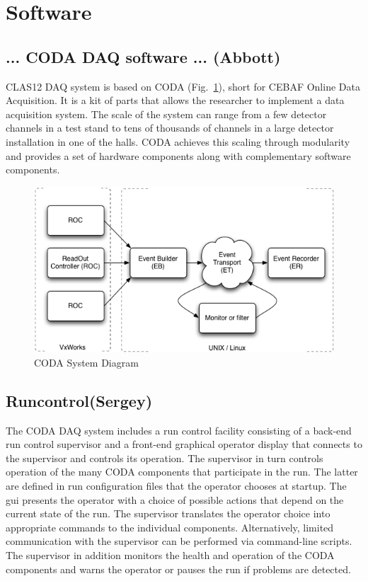 \section{Software}

\subsection{... CODA DAQ software ... (Abbott)}

CLAS12 DAQ system is based on CODA (Fig.~\ref{fig:coda_diagram}), short for CEBAF Online Data Acquisition. It is a kit of parts that allows the researcher to implement a data acquisition system. The scale of the system can range from a few detector channels in a test stand to tens of thousands of channels in a large detector installation in one of the halls. CODA achieves this scaling through modularity and provides a set of hardware components along with complementary software components.

\begin{figure}[hbt]
	\centering
	\includegraphics[width=1.0\columnwidth,keepaspectratio]{img/coda_diagram.png}
	\caption{CODA System Diagram}
	\label{fig:coda_diagram}
\end{figure}


\subsection {Runcontrol(Sergey)}

The CODA DAQ system includes a run control facility consisting of a back-end run control supervisor and a front-end graphical operator display that connects to the supervisor and controls its operation. The supervisor in turn controls operation of the many CODA components that participate in the run. The latter are defined in run configuration files that the operator chooses at startup. The gui presents the operator with a choice of possible actions that depend on the current state of the run. The supervisor translates the operator choice into appropriate commands to the individual components. Alternatively, limited communication with the supervisor can be performed via command-line scripts.
The supervisor in addition monitors the health and operation of the CODA components and warns the operator or pauses the run if problems are detected.


